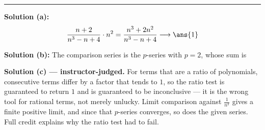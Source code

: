 \documentclass[12pt]{article}
\begin{document}
\vspace{0.2cm}\noindent\rule{\linewidth}{0.2pt}\vspace{0.2cm}


\textbf{Solution (a):} \[ \frac{n+2}{n^{3}-n+4}\cdot n^{2} = \frac{n^{3}+2n^{2}}{n^{3}-n+4} \longrightarrow \ans{1} \]

\textbf{Solution (b):} The comparison series is the $p$-series with $p = 2$, whose sum is 

\textbf{Solution (c) --- instructor-judged.} For terms that are a ratio of polynomials, consecutive terms differ by a factor that tends to $1$, so the ratio test is guaranteed to return $1$ and is guaranteed to be inconclusive --- it is the wrong tool for rational terms, not merely unlucky. Limit comparison against $\frac{1}{n^2}$ gives a finite positive limit, and since that $p$-series converges, so does the given series. Full credit explains why the ratio test had to fail.
\end{document}
